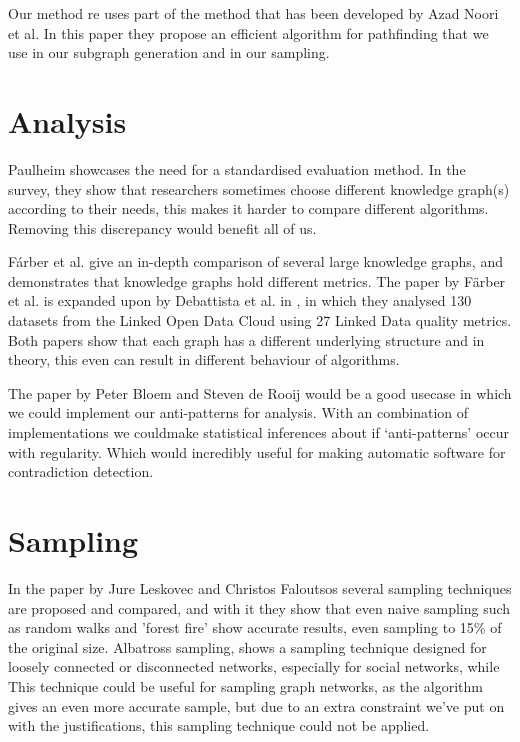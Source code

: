 \documentclass[11pt,letterpaper ,oneside ]{book}
\begin{document}
Our method re uses part of the method that has been developed by Azad Noori et al\cite{Noori:2015}. In this paper they propose an efficient algorithm for pathfinding that we use in our subgraph generation and in our sampling.

\section{Analysis}
Paulheim \cite{HeikoP:2016} showcases the need for a standardised evaluation method. In the survey, they show that researchers sometimes choose different knowledge graph(s) according to their needs, this makes it harder to compare different algorithms. Removing this discrepancy would benefit all of us.

F\'arber et al. \cite{MichaelF:2017} give an in-depth comparison of several large knowledge graphs, and demonstrates that knowledge graphs hold different metrics. The paper by F\"arber et al. \cite{MichaelF:2017} is expanded upon by Debattista et al. in \cite{Debattista:2018}, in which they analysed 130 datasets from the Linked Open Data Cloud using 27 Linked Data quality metrics. Both papers show that each graph has a different underlying structure and in theory, this even can result in different behaviour of algorithms.

The paper by Peter Bloem and Steven de Rooij\cite{BloemP:2018} would be a good usecase in which we could implement our anti-patterns for analysis. With an combination of implementations we couldmake statistical inferences about if `anti-patterns' occur with regularity. Which would incredibly useful for making automatic software for contradiction detection.

\section{Sampling}
In the paper by Jure Leskovec and Christos Faloutsos \cite{Leskovec:2006} several sampling techniques are proposed and compared, and with it they show that even naive sampling such as random walks and 'forest fire' show accurate results, even sampling to 15\% of the original size. 
\cite{Jin:2011} Albatross sampling, shows a sampling technique designed for loosely connected or disconnected networks, especially for social networks, while
This technique could be useful for sampling graph networks, as the algorithm gives an even more accurate sample, but due to an extra constraint we've put on with the justifications, this sampling technique could not be applied.
\end{document}
